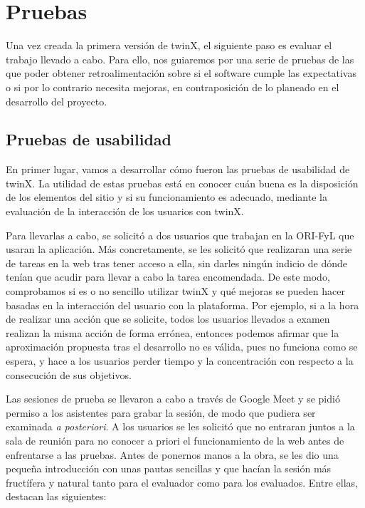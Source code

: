 \chapter{Pruebas}
\label{pruebas}

Una vez creada la primera versión de twinX, el siguiente paso es evaluar el trabajo llevado a cabo. Para ello, nos guiaremos por una serie de pruebas de las que poder obtener retroalimentación sobre si el software cumple las expectativas o si por lo contrario necesita mejoras, en contraposición de lo planeado en el desarrollo del proyecto.

\section{Pruebas de usabilidad}

En primer lugar, vamos a desarrollar cómo fueron las pruebas de usabilidad de twinX. La utilidad de estas pruebas está en conocer cuán buena es la disposición de los elementos del sitio y si su funcionamiento es adecuado, mediante la evaluación de la interacción de los usuarios con twinX.

Para llevarlas a cabo, se solicitó a dos usuarios que trabajan en la ORI-FyL que usaran la aplicación. Más concretamente, se les solicitó que realizaran una serie de tareas en la web tras tener acceso a ella, sin darles ningún indicio de dónde tenían que acudir para llevar a cabo la tarea encomendada. De este modo, comprobamos si es o no sencillo utilizar twinX y qué mejoras se pueden hacer basadas en la interacción del usuario con la plataforma. Por ejemplo, si a la hora de realizar una acción que se solicite, todos los usuarios llevados a examen realizan la misma acción de forma errónea, entonces podemos afirmar que la aproximación propuesta tras el desarrollo no es válida, pues no funciona como se espera, y hace a los usuarios perder tiempo y la concentración con respecto a la consecución de sus objetivos.

Las sesiones de prueba se llevaron a cabo a través de Google Meet \cite{googlemeet} y se pidió permiso a los asistentes para grabar la sesión, de modo que pudiera ser examinada \textit{a posteriori}. A los usuarios se les solicitó que no entraran juntos a la sala de reunión para no conocer a priori el funcionamiento de la web antes de enfrentarse a las pruebas. Antes de ponernos manos a la obra, se les dio una pequeña introducción con unas pautas sencillas \cite{krug} y que hacían la sesión más fructífera y natural tanto para el evaluador como para los evaluados. Entre ellas, destacan las siguientes:

